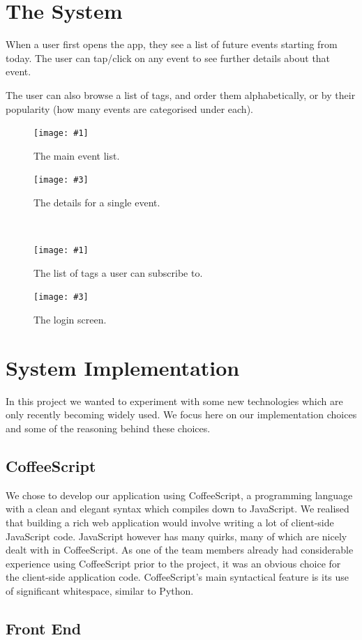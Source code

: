 \documentclass[11pt]{article}
\newcommand{\twofigure}[4]{
\begin{minipage}{0.45\textwidth}
    \centering
    \texttt{[image: \#1]}
    \caption{#2}
\end{minipage}
\begin{minipage}{0.45\textwidth}
    \centering
    \texttt{[image: \#3]}
    \caption{#4}
\end{minipage}
}
\begin{document}
\section{The System}

When a user first opens the app, they see a list of future events starting from today. The user can tap/click on any event to see further details about that event.

The user can also browse a list of tags, and order them alphabetically, or by their popularity (how many events are categorised under each).


\begin{figure}[H]
\twofigure{images/event-list.png}{The main event list.}{images/event-detail.png}{The details for a single event.}
\\[2em]
\end{figure}
\begin{figure}[H]
\twofigure{images/tag-list.png}{The list of tags a user can subscribe to.}{images/login.png}{The login screen.}
\end{figure}


\section {System Implementation}

In this project we wanted to experiment with some new technologies which are only recently becoming widely used. We focus here on our implementation choices and some of the reasoning behind these choices.

\subsection{CoffeeScript}

We chose to develop our application using CoffeeScript, a programming language with a clean and elegant syntax which compiles down to JavaScript. We realised that building a rich web application would involve writing a lot of client-side JavaScript code. JavaScript however has many quirks, many of which are nicely dealt with in CoffeeScript. As one of the team members already had considerable experience using CoffeeScript prior to the project, it was an obvious choice for the client-side application code. CoffeeScript's main syntactical feature is its use of significant whitespace, similar to Python.

\subsection {Front End}
\end{document}
